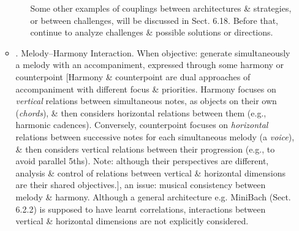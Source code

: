 \documentclass{article}
\begin{document}
\begin{itemize}
\begin{itemize}
\begin{itemize}
			Some other examples of couplings between architectures \& strategies, or between challenges, will be discussed in Sect. 6.18. Before that, continue to analyze challenges \& possible solutions or directions.
		\end{itemize}
		\item {. Melody--Harmony Interaction.} When objective: generate simultaneously a melody with an accompaniment, expressed through some harmony or counterpoint [Harmony \& counterpoint are dual approaches of accompaniment with different focus \& priorities. Harmony focuses on {\it vertical} relations between simultaneous notes, as objects on their own ({\it chords}), \& then considers horizontal relations between them (e.g., harmonic cadences). Conversely, counterpoint focuses on {\it horizontal} relations between successive notes for each simultaneous melody (a {\it voice}), \& then considers vertical relations between their progression (e.g., to avoid parallel 5ths). Note: although their perspectives are different, analysis \& control of relations between vertical \& horizontal dimensions are their shared objectives.], an issue: musical consistency between melody \& harmony. Although a general architecture e.g. MiniBach (Sect. 6.2.2) is supposed to have learnt correlations, interactions between vertical \& horizontal dimensions are not explicitly considered.


\end{itemize}
\end{itemize}
\end{document}
